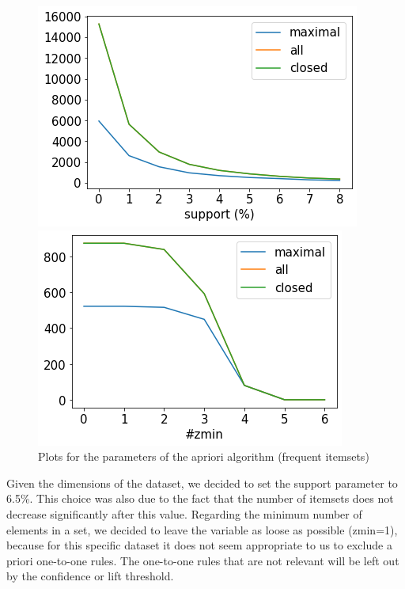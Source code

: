 \documentclass[a4paper,11pt,dvipsnames]{article}
\begin{document}
\begin{figure}[h]
\begin{minipage}{0.51\linewidth}
    \centering
    \includegraphics[width=\textwidth]{support.png}
    \end{minipage}
    \hfil
    \begin{minipage}{0.46\linewidth}
    \centering
    \includegraphics[width=\textwidth]{zmin.png}
    \end{minipage}
    \caption{Plots for the parameters of the apriori algorithm (frequent itemsets)}
    \label{fig:itemset_parameters}
\end{figure}

Given the dimensions of the dataset, we decided to set the support parameter to 6.5\%. This choice was also due to the fact that the number of itemsets does not decrease significantly after this value. 
Regarding the minimum number of elements in a set, we decided to leave the variable as loose as possible (zmin=1), because for this specific dataset it does not seem appropriate to us to exclude a priori one-to-one rules. The one-to-one rules that are not relevant will be left out by the confidence or lift threshold. 
\end{document}
